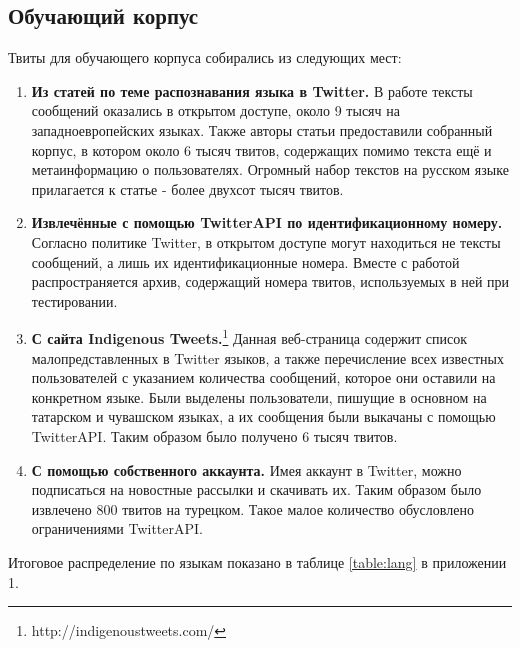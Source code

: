 \documentclass[a4paper, 14pt]{article}
\begin{document}
		\subsection{Обучающий корпус}   
			Твиты для обучающего корпуса собирались из следующих мест:
			\begin{enumerate}
				\item \textbf{Из статей по теме распознавания языка в Twitter.} В работе \cite{liga} тексты сообщений оказались в открытом доступе, около 9 тысяч на западноевропейских языках. Также авторы статьи \cite{ppm} предоставили собранный корпус, в котором около 6 тысяч твитов, содержащих помимо текста ещё и метаинформацию о пользователях. Огромный набор текстов на русском языке прилагается к статье \cite{julia} - более двухсот тысяч твитов.
				\item \textbf{Извлечённые с помощью TwitterAPI по идентификационному номеру.} Согласно политике Twitter, в открытом доступе могут находиться не тексты сообщений, а лишь их идентификационные номера. Вместе с работой \cite{lrev} распространяется архив, содержащий номера твитов, используемых в ней при тестировании. 
				\item \textbf{С сайта Indigenous Tweets.}\footnote{http://indigenoustweets.com/} Данная веб-страница содержит список малопредставленных в Twitter языков, а также перечисление всех известных пользователей с указанием количества сообщений, которое они оставили на конкретном языке. Были выделены пользователи, пишущие в основном на татарском и чувашском языках, а их сообщения были выкачаны с помощью TwitterAPI. Таким образом было получено 6 тысяч твитов.
				\item \textbf{С помощью собственного аккаунта.} Имея аккаунт в Twitter, можно подписаться на новостные рассылки и скачивать их. Таким образом было извлечено 800 твитов на турецком. Такое малое количество обусловлено ограничениями TwitterAPI.
			\end{enumerate}		
			Итоговое распределение по языкам показано в таблице \ref{table:lang} в приложении 1.	  
			 
		
			
\end{document}
